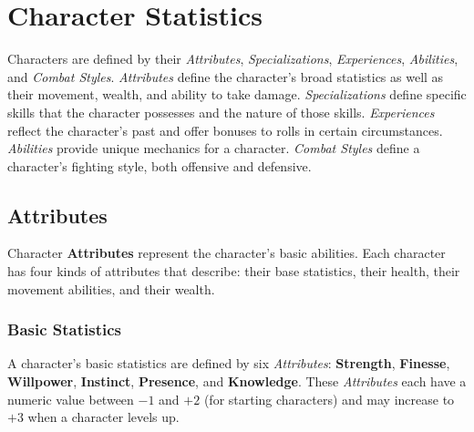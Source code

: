 \section{Character Statistics}
Characters are defined by their \emph{Attributes}, \emph{Specializations}, \emph{Experiences}, \emph{Abilities}, and \emph{Combat Styles}.
\emph{Attributes} define the character's broad statistics as well as their movement, wealth, and ability to take damage.
\emph{Specializations} define specific skills that the character possesses and the nature of those skills.
\emph{Experiences} reflect the character's past and offer bonuses to rolls in certain circumstances.
\emph{Abilities} provide unique mechanics for a character.
\emph{Combat Styles} define a character's fighting style, both offensive and defensive.

\subsection{Attributes}
Character \textbf{Attributes} represent the character's basic abilities.
Each character has four kinds of attributes that describe: their base statistics, their health, their movement abilities, and their wealth.

\subsubsection{Basic Statistics}
A character's basic statistics are defined by six \emph{Attributes}: \textbf{Strength}, \textbf{Finesse}, \textbf{Willpower}, \textbf{Instinct}, \textbf{Presence}, and \textbf{Knowledge}.
These \emph{Attributes} each have a numeric value between $-1$ and $+2$ (for starting characters) and may increase to $+3$ when a character levels up.

